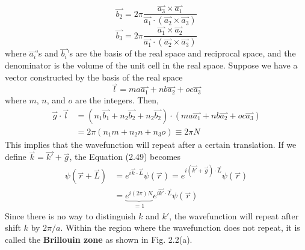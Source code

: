 \begin{equation}
\end{equation} \begin{equation}
    \overset{\rightharpoonup}{b_{2}} = 2\pi\frac{\overset{\rightharpoonup}{a_{3}}\times\overset{\rightharpoonup}{a_{1}}}{\overset{\rightharpoonup}{a_{1}}\cdot\left(\overset{\rightharpoonup}{a_{2}}\times\overset{\rightharpoonup}{a_{3}}\right)}\nonumber
\end{equation} \begin{equation}
    \overset{\rightharpoonup}{b_{3}} = 2\pi\frac{\overset{\rightharpoonup}{a_{1}}\times\overset{\rightharpoonup}{a_{2}}}{\overset{\rightharpoonup}{a_{1}}\cdot\left(\overset{\rightharpoonup}{a_{2}}\times\overset{\rightharpoonup}{a_{3}}\right)}
\end{equation} where $\overset{\rightharpoonup}{a_{i}}$'s and $\overset{\rightharpoonup}{b_{i}}$'s are the basis of the real space and reciprocal space, and the denominator is the volume of the unit cell in the real space. Suppose we have a vector constructed by the basis of the real space \begin{equation}
    \overset{\rightharpoonup}{l} = ma\overset{\rightharpoonup}{a_{1}} + nb\overset{\rightharpoonup}{a_{2}} + oc\overset{\rightharpoonup}{a_{3}}
\end{equation} where $m$, $n$, and $o$ are the integers. Then, \begin{align}
    \overset{\rightharpoonup}{g}\cdot\overset{\rightharpoonup}{l}& = \left(n_{1}\overset{\rightharpoonup}{b_{1}} + n_{2}\overset{\rightharpoonup}{b_{2}} + n_{2}\overset{\rightharpoonup}{b_{2}}\right)\cdot\left(ma\overset{\rightharpoonup}{a_{1}} + nb\overset{\rightharpoonup}{a_{2}} + oc\overset{\rightharpoonup}{a_{3}}\right)\nonumber\\
    & = 2\pi\left(n_{1}m + n_{2}n + n_{3}o\right) \equiv 2\pi N
\end{align} This implies that the wavefunction will repeat after a certain translation. If we define $\overset{\rightharpoonup}{k} = \overset{\rightharpoonup}{k'} + \overset{\rightharpoonup}{g}$, the Equation (2.49) becomes \begin{align}
    \psi\left(\overset{\rightharpoonup}{r}+\overset{\rightharpoonup}{L}\right)& = e^{i\overset{\rightharpoonup}{k}\cdot\overset{\rightharpoonup}{L}}\psi\left(\overset{\rightharpoonup}{r}\right) = e^{i\left(\overset{\rightharpoonup}{k'}+\overset{\rightharpoonup}{g}\right)\cdot\overset{\rightharpoonup}{L}}\psi\left(\overset{\rightharpoonup}{r}\right)\nonumber\\
    & = \underbrace{e^{i(2\pi)N}}_{=1}e^{i\overset{\rightharpoonup}{k'}\cdot\overset{\rightharpoonup}{L}}\psi\left(\overset{\rightharpoonup}{r}\right)
\end{align} Since there is no way to distinguish $k$ and $k'$, the wavefunction will repeat after shift $k$ by $2\pi/a$. Within the region where the wavefunction does not repeat, it is called the {\bf Brillouin zone} as shown in Fig. 2.2(a).
